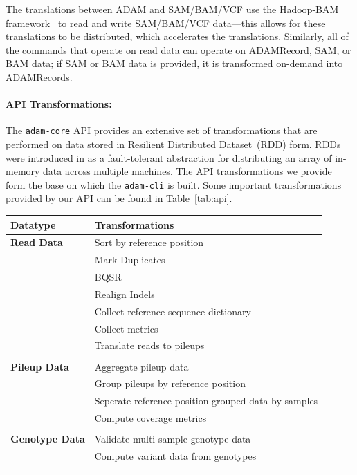 \documentclass{bioinfo}
\begin{document}
The translations between ADAM and SAM/BAM/VCF use the Hadoop-BAM framework~\citep[see][]{niemenmaa12} to read and write SAM/BAM/VCF data---this allows for these
translations to be distributed, which accelerates the translations. Similarly, all of the commands that operate on read data can operate on ADAMRecord, SAM, or BAM data;
if SAM or BAM data is provided, it is transformed on-demand into ADAMRecords.

\paragraph{API Transformations:}
\label{sec:api-transforms}

The \texttt{adam-core} API provides an extensive set of transformations that are performed on data stored in Resilient Distributed Dataset~(RDD) form. RDDs were introduced
in \citet{zaharia12} as a fault-tolerant abstraction for distributing an array of in-memory data across multiple machines. The API transformations we provide form the base on
which the \texttt{adam-cli} is built. Some important transformations provided by our API can be found in Table~\ref{tab:api}.

\begin{table}[h]
{\begin{tabular}{ l l }
\toprule
\bf Datatype & \bf Transformations \\
\midrule
\bf Read Data & Sort by reference position \\
 & Mark Duplicates \\
 & BQSR \\
 & Realign Indels \\
 & Collect reference sequence dictionary \\
 & Collect metrics \\
 & Translate reads to pileups \\
 & \\
\bf Pileup Data & Aggregate pileup data \\
 & Group pileups by reference position \\
 & Seperate reference position grouped data by samples \\
 & Compute coverage metrics \\
 & \\
\bf Genotype Data & Validate multi-sample genotype data \\
 & Compute variant data from genotypes \\
\botrule
\end{tabular}}{}
\end{table}
\end{document}
